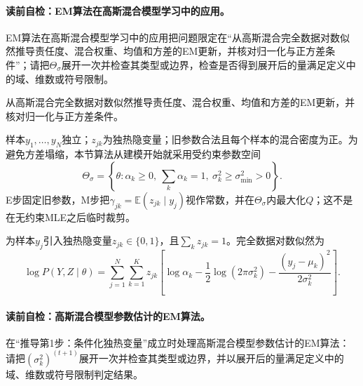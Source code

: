 \paragraph{读前自检：EM算法在高斯混合模型学习中的应用。}EM算法在高斯混合模型学习中的应用把问题限定在“从高斯混合完全数据对数似然推导责任度、混合权重、均值和方差的EM更新，并核对归一化与正方差条件”；请把$\Theta_{\sigma}$展开一次并检查其类型或边界，检查是否得到展开后的量满足定义中的域、维数或符号限制。\par


\begin{derivationgoalbox}
从高斯混合完全数据对数似然推导责任度、混合权重、均值和方差的EM更新，并核对归一化与正方差条件。
\end{derivationgoalbox}
\begin{derivationprepbox}
样本$y_1,\ldots,y_N$独立；$z_{jk}$为独热隐变量；旧参数合法且每个样本的混合密度为正。为避免方差塌缩，本节算法从建模开始就采用受约束参数空间
\[
\Theta_{\sigma}=\left\{\theta:\alpha_k\geq0,\ \sum_k\alpha_k=1,\ \sigma_k^2\geq\sigma_{\min}^2>0\right\}.
\]
E步固定旧参数，M步把$\gamma_{jk}=\mathbb E(z_{jk}\mid y_j)$视作常数，并在$\Theta_\sigma$内最大化$Q$；这不是在无约束MLE之后临时裁剪。
\end{derivationprepbox}
为样本$y_j$引入独热隐变量$z_{jk}\in\{0,1\}$，且$\sum_kz_{jk}=1$。完全数据对数似然为
\[
\log P(Y,Z\mid\theta)=\sum_{j=1}^{N}\sum_{k=1}^{K}z_{jk}
\left[\log\alpha_k-\frac12\log(2\pi\sigma_k^2)
-\frac{(y_j-\mu_k)^2}{2\sigma_k^2}\right].
\]

\paragraph{读前自检：高斯混合模型参数估计的EM算法。}在“推导第1步：条件化独热变量”成立时处理高斯混合模型参数估计的EM算法：请把$(\sigma_k^2)^{(t+1)}$展开一次并检查其类型或边界，并以展开后的量满足定义中的域、维数或符号限制判定结果。\par

